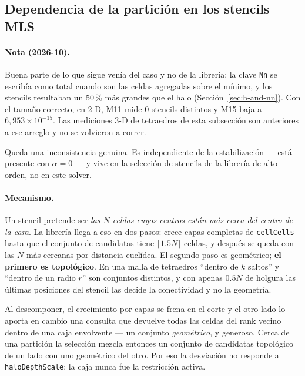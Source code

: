 \documentclass[11pt,a4paper]{article}
\newcommand{\code}[1]{\texttt{\small #1}}
\begin{document}
\subsection{Dependencia de la partición en los stencils MLS}
\label{sec:dist-stencils}

\paragraph{Nota (2026-10).} Buena parte de lo que sigue venía del caso y no de la
librería: la clave \code{Nn} se escribía como total cuando son las celdas agregadas
sobre el mínimo, y los stencils resultaban un 50\,\% más grandes que el halo
(Sección~\ref{sec:h-and-nn}). Con el tamaño correcto, en 2-D, M11 mide 0 stencils
distintos y M15 baja a $6{,}953\times10^{-15}$. Las mediciones 3-D de tetraedros de
esta subsección son anteriores a ese arreglo y no se volvieron a correr.

Queda una inconsistencia genuina. Es independiente de la estabilización --- está
presente con $\alpha=0$ --- y vive en la selección de stencils de la librería de
alto orden, no en este solver.

\paragraph{Mecanismo.} Un stencil pretende ser \emph{las $N$ celdas cuyos
centros están más cerca del centro de la cara}. La librería llega a eso en dos
pasos: crece capas completas de \code{cellCells} hasta que el conjunto de
candidatas tiene $\lceil 1.5N\rceil$ celdas, y después se queda con las $N$ más
cercanas por distancia euclídea. El segundo paso es geométrico; \textbf{el
primero es topológico}. En una malla de tetraedros ``dentro de $k$ saltos'' y
``dentro de un radio $r$'' son conjuntos distintos, y con apenas $0.5N$ de
holgura las últimas posiciones del stencil las decide la conectividad y no la
geometría.

Al descomponer, el crecimiento por capas se frena en el corte y el otro lado lo
aporta en cambio una consulta que devuelve todas las celdas del rank vecino
dentro de una caja envolvente --- un conjunto \emph{geométrico}, y generoso.
Cerca de una partición la selección mezcla entonces un conjunto de candidatas
topológico de un lado con uno geométrico del otro. Por eso la desviación no
responde a \code{haloDepthScale}: la caja nunca fue la restricción activa.
\end{document}
